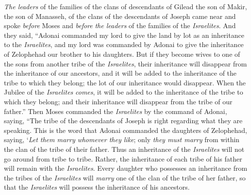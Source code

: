 \begin{biblechapter} %
 \textit{The leaders} of the families of the clans of descendants of Gilead the son of Makir, the son of Manasseh, of the clans of the descendants of Joseph came near and spoke \textit{before} Moses and \textit{before} \textit{the leaders} of the families of the \textit{Israelites}.
\verse And they said, “Adonai commanded my lord to give the land by lot as an inheritance to the \textit{Israelites}, and my lord was commanded by Adonai to give the inheritance of Zelophehad our brother to his daughters.
\verse But if they become wives to one of the sons from another tribe of the \textit{Israelites}, their inheritance will disappear from the inheritance of our ancestors, and it will be added to the inheritance of the tribe to which they belong; the lot of our inheritance would disappear.
\verse When the Jubilee of the \textit{Israelites} \textit{comes}, it will be added to the inheritance of the tribe to which they belong; and their inheritance will disappear from the tribe of our father.”
\verse Then Moses commanded the \textit{Israelites} by the command of Adonai, saying, “The tribe of the descendants of Joseph is right regarding what they are speaking.
\verse This is the word that Adonai commanded the daughters of Zelophehad, saying, ‘\textit{Let them marry} \textit{whomever they like}; only \textit{they must marry} from within the clan of the tribe of their father.
\verse Thus an inheritance of the \textit{Israelites} will not go around from tribe to tribe. Rather, the inheritance of each tribe of his father will remain with the \textit{Israelites}.
\verse Every daughter who possesses an inheritance from the tribes of the \textit{Israelites} will \textit{marry} one of the clan of the tribe of her father, so that the \textit{Israelites} will possess the inheritance of his ancestors.

\end{biblechapter}

